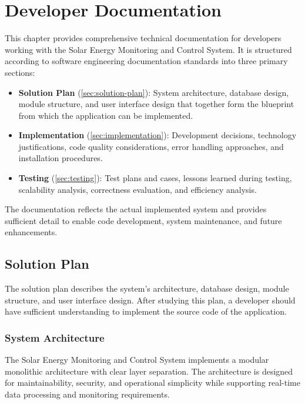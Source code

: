 \chapter{Developer Documentation}
\label{ch:developer}

This chapter provides comprehensive technical documentation for developers working with the Solar Energy Monitoring and Control System. It is structured according to software engineering documentation standards into three primary sections:

\begin{itemize}
    \item \textbf{Solution Plan} (\autoref{sec:solution-plan}): System architecture, database design, module structure, and user interface design that together form the blueprint from which the application can be implemented.
    \item \textbf{Implementation} (\autoref{sec:implementation}): Development decisions, technology justifications, code quality considerations, error handling approaches, and installation procedures.
    \item \textbf{Testing} (\autoref{sec:testing}): Test plans and cases, lessons learned during testing, scalability analysis, correctness evaluation, and efficiency analysis.
\end{itemize}

The documentation reflects the actual implemented system and provides sufficient detail to enable code development, system maintenance, and future enhancements.

\section{Solution Plan}
\label{sec:solution-plan}

The solution plan describes the system's architecture, database design, module structure, and user interface design. After studying this plan, a developer should have sufficient understanding to implement the source code of the application.

\subsection{System Architecture}
\label{subsec:system-architecture}

The Solar Energy Monitoring and Control System implements a modular monolithic architecture with clear layer separation. The architecture is designed for maintainability, security, and operational simplicity while supporting real-time data processing and monitoring requirements.

